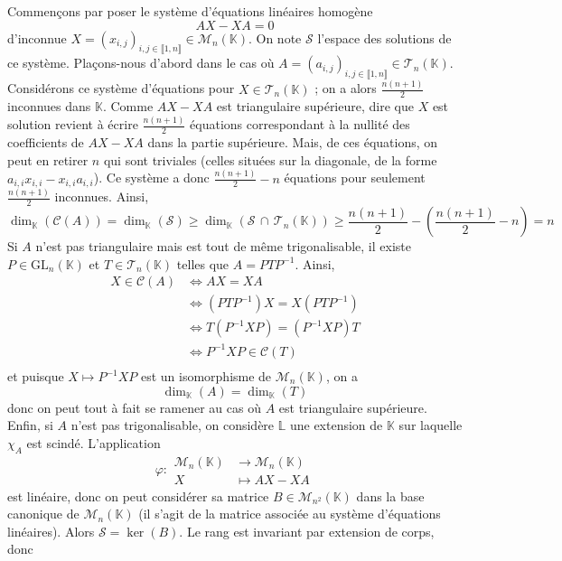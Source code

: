 	\begin{demonstration}
		Commençons par poser le système d'équations linéaires homogène
		\[ AX - XA = 0 \]
		d'inconnue $X = (x_{i,j})_{i,j \in \llbracket 1, n \rrbracket} \in \mathcal{M}_n(\mathbb{K})$. On note $\mathcal{S}$ l'espace des solutions de ce système.
		\newpar
		Plaçons-nous d'abord dans le cas où $A = (a_{i,j})_{i,j \in \llbracket 1, n \rrbracket} \in \mathcal{T}_n(\mathbb{K})$. Considérons ce système d'équations pour $X \in \mathcal{T}_n(\mathbb{K})$ ; on a alors $\frac{n(n+1)}{2}$ inconnues dans $\mathbb{K}$. Comme $AX-XA$ est triangulaire supérieure, dire que $X$ est solution revient à écrire $\frac{n(n+1)}{2}$ équations correspondant à la nullité des coefficients de $AX - XA$ dans la partie supérieure. Mais, de ces équations, on peut en retirer $n$ qui sont triviales (celles situées sur la diagonale, de la forme $a_{i,i} x_{i,i} - x_{i,i} a_{i,i}$). Ce système a donc $\frac{n(n+1)}{2} - n$ équations pour seulement $\frac{n(n+1)}{2}$ inconnues. Ainsi,
		\[ \dim_{\mathbb{K}}(\mathcal{C}(A)) = \dim_{\mathbb{K}}(\mathcal{S}) \geq \dim_{\mathbb{K}}(\mathcal{S} \, \cap \, \mathcal{T}_n(\mathbb{K})) \geq \frac{n(n+1)}{2} - \left( \frac{n(n+1)}{2} - n \right) = n \]
		Si $A$ n'est pas triangulaire mais est tout de même trigonalisable, il existe $P \in \mathrm{GL}_n(\mathbb{K})$ et $T \in \mathcal{T}_n(\mathbb{K})$ telles que $A = PTP^{-1}$. Ainsi,
		\begin{align*}
			X \in \mathcal{C}(A) &\iff AX = XA \\
			&\iff (PTP^{-1}) X = X (PTP^{-1}) \\
			&\iff T (P^{-1}XP) = (P^{-1}XP) T \\
			&\iff P^{-1}XP \in \mathcal{C}(T) \\
		\end{align*}
		et puisque $X \mapsto P^{-1}XP$ est un isomorphisme de $\mathcal{M}_n(\mathbb{K})$, on a
		\[ \dim_{\mathbb{K}}(A) = \dim_{\mathbb{K}}(T) \]
		donc on peut tout à fait se ramener au cas où $A$ est triangulaire supérieure.
		\newpar
		Enfin, si $A$ n'est pas trigonalisable, on considère $\mathbb{L}$ une extension de $\mathbb{K}$ sur laquelle $\chi_A$ est scindé. L'application
		\[ \varphi :
		\begin{array}{cl}
			\mathcal{M}_n(\mathbb{K}) &\rightarrow \mathcal{M}_n(\mathbb{K}) \\
			X &\mapsto AX-XA
		\end{array}
		\]
		est linéaire, donc on peut considérer sa matrice $B \in \mathcal{M}_{n^2}(\mathbb{K})$ dans la base canonique de $\mathcal{M}_n(\mathbb{K})$ (il s'agit de la matrice associée au système d'équations linéaires). Alors $\mathcal{S} = \ker(B)$. Le rang est invariant par extension de corps, donc

\end{demonstration}
